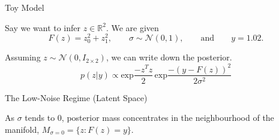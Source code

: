 \documentclass[10pt]{beamer}
\newcommand{\R}{\mathbb{R}}
\newcommand{\N}{\mathcal{N}}
\begin{document}
\begin{frame}[fragile]{Toy Model}

    Say we want to infer $z \in \R^2$. We are given
    $$F(z) = z_0^2 + z_1^2, \qquad \sigma \sim \N(0,1), \qquad \text{and} \qquad  y = 1.02.$$ 
    
    \vspace{20pt}
    
    Assuming $z\sim \N(0, I_{2 \times 2})$, we can write down the posterior.
    $$p(z|y) \propto \text{exp}\frac{-z^T z}{2} \, \text{exp}\frac{-(y - F(z))^2}{2 \sigma^2}   $$

\end{frame}

\begin{frame}[fragile]{The Low-Noise Regime (Latent Space)}
    
    As $\sigma$ tends to 0, posterior mass concentrates in the neighbourhood of the manifold, $M_{\sigma=0} =\{z : F(z) = y\}$.
    

\end{frame}
\end{document}
